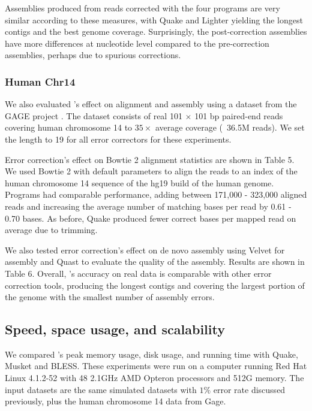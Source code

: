 \documentclass{bmcart}
\begin{document}
Assemblies produced from reads corrected with the four programs are very similar according to these measures, with Quake and Lighter yielding the longest contigs and the best genome coverage. Surprisingly, the post-correction assemblies have more differences at nucleotide level compared to the pre-correction assemblies, perhaps due to spurious corrections.

\subsubsection*{Human Chr14}
We also evaluated \tool's effect on alignment and assembly using a dataset from the GAGE project \cite{salzberg2012gage}.  The dataset consists of real 101 $\times$ 101 bp paired-end reads covering human chromosome 14 to $35\times$ average coverage (~36.5M reads).  We set the \kmer length to 19 for all error correctors for these experiments.

Error correction's effect on Bowtie 2 alignment statistics are shown in Table 5.  We used Bowtie 2 with default parameters to align the reads to an index of the human chromosome 14 sequence of the hg19 build of the human genome.  Programs had comparable performance, adding between 171,000 - 323,000 aligned reads and increasing the average number of matching bases per read by 0.61 - 0.70 bases. As before, Quake produced fewer correct bases per mapped read on average due to trimming.   



We also tested error correction's effect on de novo assembly using Velvet for assembly and Quast to evaluate the quality of the assembly.  Results are shown in Table 6.  Overall, \tool's accuracy on real data is comparable with other error correction tools, producing the longest contigs and covering the largest portion of the genome with the smallest number of assembly errors.   

\subsection*{Speed, space usage, and scalability}

We compared \tool's peak memory usage, disk usage, and running time with Quake, Musket and BLESS.  These experiments were run on a computer running Red Hat Linux 4.1.2-52 with 48 2.1GHz AMD Opteron processors and 512G memory.
The input datasets are the same simulated \ecoli datasets with $1\%$ error rate discussed previously, plus the human chromosome 14 data from Gage.
\end{document}
